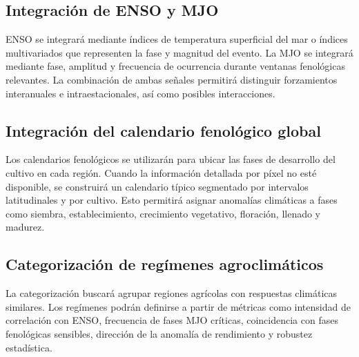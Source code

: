 \subsection{Integración de ENSO y MJO}

ENSO se integrará mediante índices de temperatura superficial del mar o índices multivariados que representen la fase y magnitud del evento. La MJO se integrará mediante fase, amplitud y frecuencia de ocurrencia durante ventanas fenológicas relevantes. La combinación de ambas señales permitirá distinguir forzamientos interanuales e intraestacionales, así como posibles interacciones.


\subsection{Integración del calendario fenológico global}

Los calendarios fenológicos se utilizarán para ubicar las fases de desarrollo del cultivo en cada región. Cuando la información detallada por píxel no esté disponible, se construirá un calendario típico segmentado por intervalos latitudinales y por cultivo. Esto permitirá asignar anomalías climáticas a fases como siembra, establecimiento, crecimiento vegetativo, floración, llenado y madurez.


\subsection{Categorización de regímenes agroclimáticos}

La categorización buscará agrupar regiones agrícolas con respuestas climáticas similares. Los regímenes podrán definirse a partir de métricas como intensidad de correlación con ENSO, frecuencia de fases MJO críticas, coincidencia con fases fenológicas sensibles, dirección de la anomalía de rendimiento y robustez estadística.



